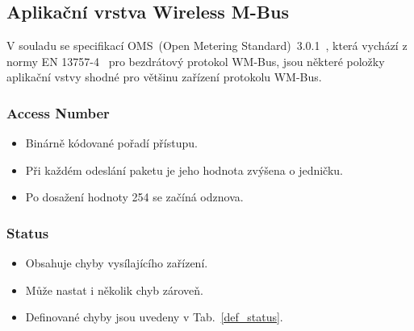 
\subsection{Aplikační vrstva Wireless M-Bus}

V souladu se specifikací OMS~(Open Metering Standard)~3.0.1~\cite{NormaOMS}, která vychází z normy EN 13757-4~\cite{Norma4} pro bezdrátový protokol WM-Bus, jsou některé položky aplikační vstvy shodné pro většinu zařízení protokolu WM-Bus.


\subsubsection{Access Number}
\begin{itemize}
	\item Binárně kódované pořadí přístupu.
	\item Při každém odeslání paketu je jeho hodnota zvýšena o jedničku.
	\item Po dosažení hodnoty 254 se začíná odznova.
\end{itemize}

\subsubsection{Status}
\begin{itemize}
	\item Obsahuje chyby vysílajícího zařízení.
	\item Může nastat i několik chyb zároveň.
	\item Definované chyby jsou uvedeny v Tab.~\ref{def_status}.
\end{itemize}


